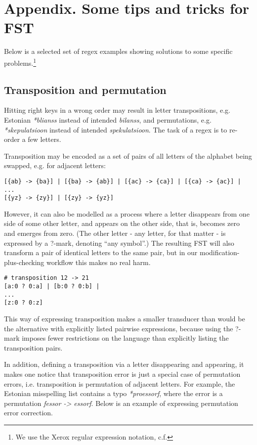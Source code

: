 \documentclass{flammie}
\begin{document}
\newpage
\appendix

\section{Appendix. Some tips and tricks for FST}

Below is a selected set of regex examples showing solutions to some specific
problems.\footnote{We use the Xerox regular expression notation,
c.f.\cite{beesley2003finite}}

\subsection{Transposition and permutation}

Hitting right keys in a wrong order may result in letter transpositions, e.g.
Estonian \textit{*blianss} instead of intended \textit{bilanss}, and
permutations, e.g. \textit{*skepulatsioon} instead of intended
\textit{spekulatsioon}. The task of a regex is to re-order a few letters.

Transposition may be encoded as a set of pairs of all letters of the alphabet
being swapped, e.g. for adjacent letters:
\begin{lstlisting}
[{ab} -> {ba}] | [{ba} -> {ab}] | [{ac} -> {ca}] | [{ca} -> {ac}] |
...
[{yz} -> {zy}] | [{zy} -> {yz}]
\end{lstlisting}

However, it can also be modelled as a process where a letter disappears from one
side of some other letter, and appears on the other side, that is, becomes zero
and emerges from zero. (The other letter - any letter, for that matter - is
expressed by a ?-mark, denoting ``any symbol''.) The resulting FST will also
transform a pair of identical letters to the same pair, but in our
modification-plus-checking workflow this makes no real harm.

\begin{lstlisting}
# transposition 12 -> 21
[a:0 ? 0:a] | [b:0 ? 0:b] |
...
[z:0 ? 0:z]
\end{lstlisting}

This way of expressing transposition makes a smaller transducer than would be
the alternative with explicitly listed pairwise expressions, because using the
?-mark imposes fewer restrictions on the language than explicitly listing the
transposition pairs.

In addition, defining a transposition via a letter disappearing and appearing,
it makes one notice that transposition error is just a special case of
permutation errors, i.e. transposition is permutation of adjacent letters. For
example, the Estonian misspelling list contains a typo \textit{*proessorf},
where the error is a permutation \textit{fessor -> essorf}. Below is an example
of expressing permutation error correction.
\end{document}

